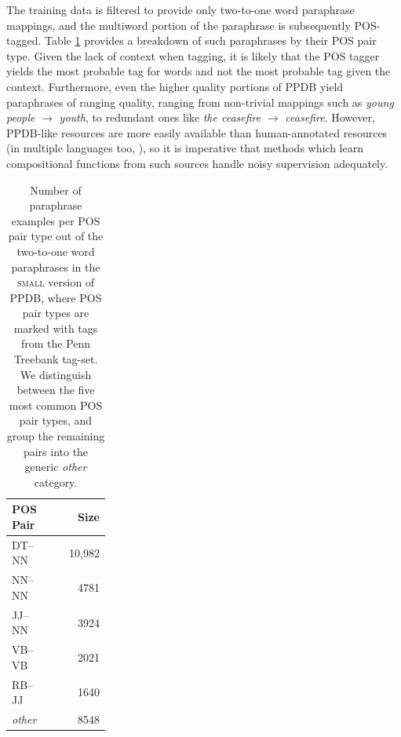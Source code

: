 \documentclass[11pt,letterpaper]{article}
\begin{document}
The training data is filtered to provide only two-to-one word paraphrase mappings, and the multiword portion of the paraphrase is subsequently POS-tagged.
Table \ref{tab:pos-stats} provides a breakdown of such paraphrases by their POS pair type.  
Given the lack of context when tagging, it is likely that the POS tagger yields the most probable tag for words and not the most probable tag given the context. 
Furthermore, even the higher quality portions of PPDB yield paraphrases of ranging quality, ranging from non-trivial mappings such as \emph{young people} $\rightarrow$ \emph{youth}, to redundant ones like \emph{the ceasefire} $\rightarrow$ \emph{ceasefire}. 
However, PPDB-like resources are more easily available than human-annotated resources (in multiple languages too, ), so it is imperative that methods which learn compositional functions from such sources handle noisy supervision adequately. 

\begin{table}[h!]
  \begin{center}
    \begin{tabular}{p{0.25\linewidth}r}
      \hline
      POS Pair & Size \\
	  \hline
      DT--NN & 10,982 \\
	  NN--NN &  4781 \\
	  JJ--NN & 3924 \\
  	  VB--VB  &  2021 \\
      RB--JJ &  1640 \\
	  \emph{other}  & 8548 \\
	\end{tabular}
  \end{center}
  \caption{Number of paraphrase examples per POS pair type out of the two-to-one word paraphrases in the \textsc{small} version of PPDB, where POS pair types are marked with tags from the Penn Treebank tag-set. We distinguish between the five most common POS pair types, and group the remaining pairs into the generic \emph{other} category.}
  \label{tab:pos-stats}
\end{table}
\end{document}
